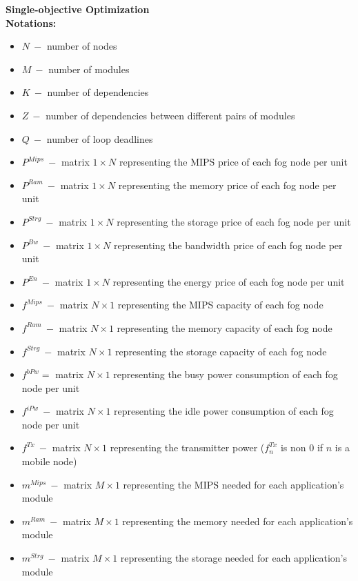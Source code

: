 \documentclass{article}
\begin{document}
\newcommand{\SubItem}[1]{
    {\setlength\itemindent{15pt} \item[-] #1}
}

\pagebreak
\noindent\textbf{Single-objective Optimization}\\[12pt]
\noindent\textbf{Notations:}
\begin{itemize}
	\item $N~-$ number of nodes
	\item $M~-$ number of modules
	\item $K~-$ number of dependencies
	\item $Z~-$ number of dependencies between different pairs of modules
	\item $Q~-$ number of loop deadlines\\
	
	\item $P^{Mips}~-$ matrix $1\times N$ representing the MIPS price of each fog node per unit
	\item $P^{Ram}~-$ matrix $1\times N$ representing the memory price of each fog node per unit
	\item $P^{Strg}~-$ matrix $1\times N$ representing the storage price of each fog node per unit
	\item $P^{Bw}~-$ matrix $1\times N$ representing the bandwidth price of each fog node per unit
	\item $P^{En}~-$ matrix $1\times N$ representing the energy price of each fog node per unit\\
	
	\item $f^{Mips}~-$ matrix $N\times 1$ representing the MIPS capacity of each fog node
	\item $f^{Ram}~-$ matrix $N\times 1$ representing the memory capacity of each fog node
	\item $f^{Strg}~-$ matrix $N\times 1$ representing the storage capacity of each fog node
	\item $f^{bPw}=$ matrix $N\times 1$ representing the busy power consumption of each fog node per unit
	\item $f^{iPw}~-$ matrix $N\times 1$ representing the idle power consumption of each fog node per unit
	\item $f^{Tx}~-$ matrix $N\times 1$ representing the transmitter power ($f^{Tx}_n$ is non 0 if $n$ is a mobile node)\\
	
	\item $m^{Mips}~-$ matrix $M\times 1$ representing the MIPS needed for each application's module
	\item $m^{Ram}~-$ matrix $M\times 1$ representing the memory needed for each application's module
	\item $m^{Strg}~-$ matrix $M\times 1$ representing the storage needed for each application's module\\
	

\end{itemize}
\end{document}
